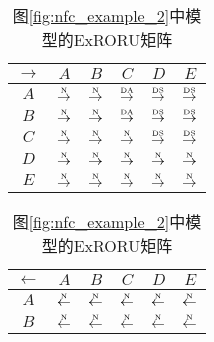 \begin{table}[htbp]
  \begin{subtable}{1\textwidth}
    \vspace{1em}
    \centering
    \caption{图\ref{fig:nfc_example_2}中模型的ExRORU矩阵}
    \label{tab:nfc_example_2}
    \begin{minipage}[b]{0.3\textwidth}
      \centering
      \begin{tabular}{|c|c|c|c|c|c|} \hline
        $\rightarrow$ & $A$ & $B$ & $C$ & $D$ & $E$\\ \hline
        $A$ & $\overset{\text{\tiny{N}}}{\rightarrow}$ & $\overset{\text{\tiny{N}}}{\rightarrow}$ & $\overset{\text{\tiny{DA}}}{\rightarrow}$ & $\overset{\text{\tiny{DS}}}{\rightarrow}$ & $\overset{\text{\tiny{DS}}}{\rightarrow}$\\ \hline
        $B$ & $\overset{\text{\tiny{N}}}{\rightarrow}$ & $\overset{\text{\tiny{N}}}{\rightarrow}$ & $\overset{\text{\tiny{DA}}}{\rightarrow}$ & $\overset{\text{\tiny{DS}}}{\rightarrow}$ & $\overset{\text{\tiny{DS}}}{\rightarrow}$\\ \hline
        $C$ & $\overset{\text{\tiny{N}}}{\rightarrow}$ & $\overset{\text{\tiny{N}}}{\rightarrow}$ & $\overset{\text{\tiny{N}}}{\rightarrow}$ & $\overset{\text{\tiny{DS}}}{\rightarrow}$ & $\overset{\text{\tiny{DS}}}{\rightarrow}$\\ \hline
        $D$ & $\overset{\text{\tiny{N}}}{\rightarrow}$ & $\overset{\text{\tiny{N}}}{\rightarrow}$ & $\overset{\text{\tiny{N}}}{\rightarrow}$ & $\overset{\text{\tiny{N}}}{\rightarrow}$ & $\overset{\text{\tiny{N}}}{\rightarrow}$\\ \hline
        $E$ & $\overset{\text{\tiny{N}}}{\rightarrow}$ & $\overset{\text{\tiny{N}}}{\rightarrow}$ & $\overset{\text{\tiny{N}}}{\rightarrow}$ & $\overset{\text{\tiny{N}}}{\rightarrow}$ & $\overset{\text{\tiny{N}}}{\rightarrow}$\\ \hline
      \end{tabular}
    \end{minipage}
    \begin{minipage}[b]{0.3\textwidth}
      \centering
      \begin{tabular}{|c|c|c|c|c|c|} \hline
        $\leftarrow$ & $A$ & $B$ & $C$ & $D$ & $E$\\ \hline
        $A$ & $\overset{\text{\tiny{N}}}{\leftarrow}$ & $\overset{\text{\tiny{N}}}{\leftarrow}$ & $\overset{\text{\tiny{N}}}{\leftarrow}$ & $\overset{\text{\tiny{N}}}{\leftarrow}$ & $\overset{\text{\tiny{N}}}{\leftarrow}$\\ \hline
        $B$ & $\overset{\text{\tiny{N}}}{\leftarrow}$ & $\overset{\text{\tiny{N}}}{\leftarrow}$ & $\overset{\text{\tiny{N}}}{\leftarrow}$ & $\overset{\text{\tiny{N}}}{\leftarrow}$ & $\overset{\text{\tiny{N}}}{\leftarrow}$\\ \hline

\end{tabular}
\end{minipage}
\end{subtable}
\end{table}
